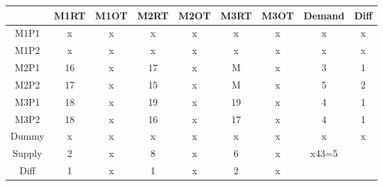 \documentclass{article}%
\begin{document}
\begin{tabular}{c|cc|c|ccccc}
    & M1RT & M1OT & M2RT & M2OT & M3RT & M3OT & Demand               & Diff                 \\
    \midrule
    M1P1   & x    & x    & x    & x    & x    & x    & x                    & x                    \\
    M1P2   & x    & x    & x    & x    & x    & x    & x                    & x                    \\
    M2P1   & 16   & x    & 17   & x    & M    & x    & 3                    & 1                    \\
    \cmidrule{2-9}
    M2P2   & 17   & x    & 15   & x    & M    & x    & 5                    & 2                    \\
    \cmidrule{2-9}
    M3P1   & 18   & x    & 19   & x    & 19   & x    & 4                    & 1                    \\
    M3P2   & 18   & x    & 16   & x    & 17   & x    & 4                    & 1                    \\
    Dummy  & x    & x    & x    & x    & x    & x    & x                    & x                    \\
    Supply & 2    & x    & 8    & x    & 6    & x    & x43=5                &                      \\
    Diff   & 1    & x    & 1    & x    & 2    & x    &                      &                      \\
\end{tabular}
\newline
\newline
\end{document}
